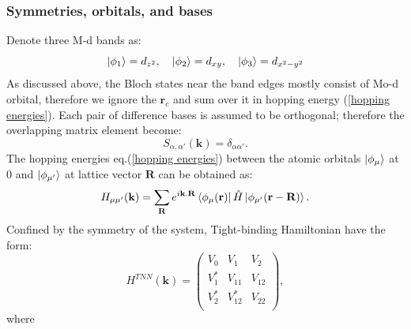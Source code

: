 \documentclass[12pt,english,a4paper]{article}
\begin{document}
	\subsubsection{Symmetries, orbitals, and bases}
	\quad Denote three M-d bands as:
	\begin{equation}
		\ket{\phi_{1}} = d_{z^2},\quad \ket{\phi_2} = d_{xy}, \quad \ket{\phi_3} = d_{x^2- y^2}
	\end{equation}
	\quad As discussed above, the Bloch states near the band edges mostly consist of Mo-d orbital, therefore we ignore the $\textbf{r}_c$ and sum over it in hopping energy (\ref{hopping energies}). Each pair of difference bases is assumed to be orthogonal; therefore the overlapping matrix element become:
	$$S_{\alpha, \alpha'}(\textbf{k}) = \delta_{\alpha \alpha'}.$$
	\quad The hopping energies eq.(\ref{hopping energies}) between the atomic orbitals $\ket{\phi_{\mu}}$ at 0 and $\ket{\phi_{\mu'}}$ at lattice vector $\textbf{R}$ can be obtained as: $$H_{\mu \mu'}(\textbf{k}) =\sum_{\textbf{R}} e^{i\textbf{k}.\textbf{R}}  \bra{\phi_{\mu}(\textbf{r})}  \hat{H} \ket{\phi_{\mu'}(\textbf{r}-\textbf{R})}.$$
	\quad Confined by the symmetry of the system, Tight-binding Hamiltonian have the form:
	\begin{equation}
		H^{TNN}(\textbf{k}) =
		\begin{pmatrix}
			V_0  & V_1   & V_2 \\
			V_1^*& V_{11}& V_{12} \\
			V_2^*& V_{12}^* & V_{22} \\
		\end{pmatrix},
	\end{equation}
	where
\end{document}
